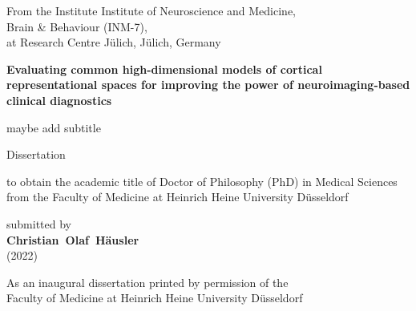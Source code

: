 \documentclass[english,12pt]{report}
\begin{document}
\pagestyle{plain}
\begin{spacing}{1.5}




\begin{titlepage}
\begin{center}

From the Institute Institute of Neuroscience and Medicine,\\
Brain \& Behaviour (INM-7),\\
at Research Centre Jülich, Jülich, Germany

\vfill

\textbf{{\large Evaluating common high-dimensional models of cortical
representational spaces for improving the power of neuroimaging-based
clinical diagnostics}}

maybe add subtitle

\vfill

{\large Dissertation}

\vfill

to obtain the academic title of Doctor of Philosophy (PhD) in Medical Sciences\\
from the Faculty of Medicine at Heinrich Heine University Düsseldorf

\vfill

submitted by\\
\textbf{Christian~Olaf~Häusler}\\
(2022)

\end{center}
\end{titlepage}




\newpage



\vfill
\noindent As an inaugural dissertation printed by permission of the\\
Faculty of Medicine at Heinrich Heine University Düsseldorf


\end{spacing}
\end{document}

